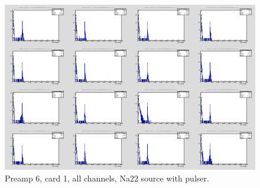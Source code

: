 \documentclass{report}
\begin{document}
\begin{figure}[!htb]
  \includegraphics[width=\linewidth]{dr_latest_test/preamp6_lim_energy_card1_pulser.png}
  \caption{Preamp 6, card 1, all channels, Na22 source with pulser.}
\end{figure}
\newpage
\clearpage
\end{document}
